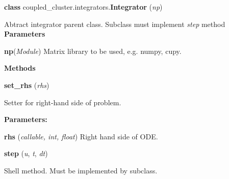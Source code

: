 \begin{tcolorbox}
    {\selectfont
    \textbf{class} coupled\_cluster.integrators.\textbf{Integrator}
    (\emph{np})

    \vspace{1em}
    Abtract integrator parent class. Subclass must implement \emph{step} method       
    \vspace{1em}
    \textbf{Parameters}

    \hspace{2em}\textbf{np}(\emph{Module})
        Matrix library to be used, e.g. numpy, cupy.

    \vspace{1em} 
    \textbf{Methods}

    \hspace{2em} \textbf{set\_rhs} (\emph{rhs})

        \begin{adjustwidth}{4em}{}
        Setter for right-hand side of problem.

        \textbf{Parameters:} 

            \hspace{1.5em}\textbf{rhs} (\emph{callable, int, float}) 
                Right hand side of ODE.

        \end{adjustwidth}

    \hspace{2em} \textbf{step} (\emph{u}, \emph{t}, \emph{dt})

        \begin{adjustwidth}{4em}{}
            Shell method. Must be implemented by subclass.
        \end{adjustwidth}

    } 
\end{tcolorbox}